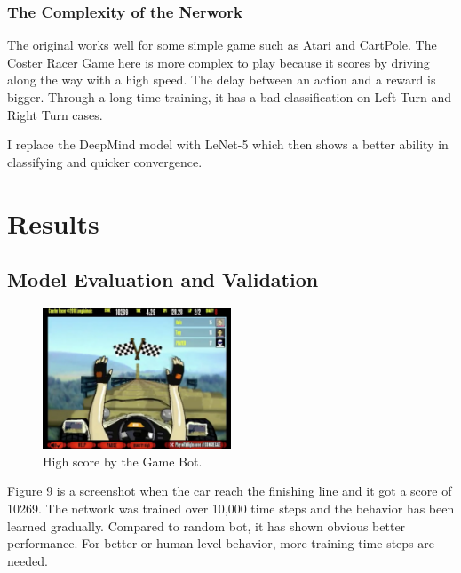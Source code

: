 \documentclass[a4paper]{article}
\begin{document}
\subsubsection{The Complexity of the Nerwork}
The original works well for some simple game such as Atari and CartPole. The Coster Racer Game here is more complex to play because it scores by driving along the way with a high speed. The delay between an action and a reward is bigger. Through a long time training, it has a bad classification on Left Turn and Right Turn cases.

I replace the DeepMind model with LeNet-5 which then shows a better ability in classifying and quicker convergence.

\section{Results}

\subsection{Model Evaluation and Validation}

\begin{figure}[h]
\centering
\includegraphics[width=0.5\textwidth]{high-score-by-gamebot}
\caption{High score by the Game Bot.}
\end{figure}

Figure 9 is a screenshot when the car reach the finishing line and it got a score of 10269. The network was trained over 10,000 time steps and the behavior has been learned gradually. Compared to random bot, it has shown obvious better performance. For better or human level behavior, more training time steps are needed.

\end{document}
